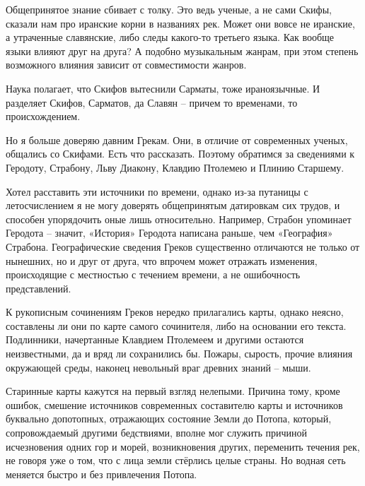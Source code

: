 
Общепринятое знание сбивает с толку. Это ведь ученые, а не сами Скифы, сказали нам про иранские корни в названиях рек. Может они вовсе не иранские, а утраченные славянские, либо следы какого-то третьего языка. Как вообще языки влияют друг на друга? А подобно музыкальным жанрам, при этом степень возможного влияния зависит от совместимости жанров.

Наука полагает, что Скифов вытеснили Сарматы, тоже ираноязычные. И разделяет Скифов, Сарматов, да Славян – причем то временами, то происхождением. 

Но я больше доверяю давним Грекам. Они, в отличие от современных ученых, общались со Скифами. Есть что рассказать. Поэтому обратимся за сведениями к Геродоту, Страбону, Льву Диакону, Клавдию Птолемею и Плинию Старшему.

Хотел расставить эти источники по времени, однако из-за путаницы с летосчислением я не могу доверять общепринятым датировкам сих трудов, и способен упорядочить оные лишь относительно. Например, Страбон упоминает Геродота – значит, «История» Геродота написана раньше, чем «География» Страбона. Географические сведения Греков существенно отличаются не только от нынешних, но и друг от друга, что впрочем может отражать изменения, происходящие с местностью с течением времени, а не ошибочность представлений.

К рукописным сочинениям Греков нередко прилагались карты, однако неясно, составлены ли они по карте самого сочинителя, либо на основании его текста. Подлинники, начертанные Клавдием Птолемеем и другими остаются неизвестными, да и вряд ли сохранились бы. Пожары, сырость, прочие влияния окружающей среды, наконец невольный враг древних знаний – мыши.

Старинные карты кажутся на первый взгляд нелепыми. Причина тому, кроме ошибок, смешение источников современных составителю карты и источников буквально допотопных, отражающих состояние Земли до Потопа, который, сопровождаемый другими бедствиями, вполне мог служить причиной исчезновения одних гор и морей, возникновения других, переменить течения рек, не говоря уже о том, что с лица земли стёрлись целые страны. Но водная сеть меняется быстро и без привлечения Потопа.

